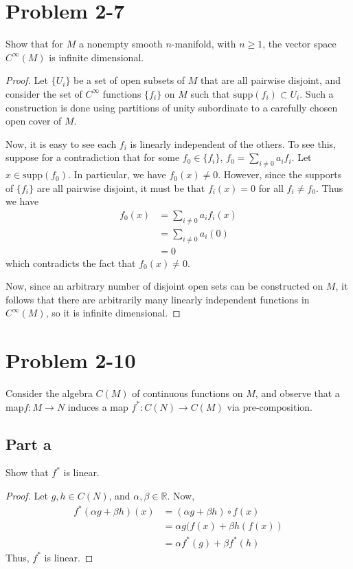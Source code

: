 \documentclass[fontsize=11pt]{scrartcl} %
\numberwithin{equation}{section} %
\numberwithin{figure}{section} %
\numberwithin{table}{section} %
\newcommand{\R}{\mathbb{R}}
\newcommand{\supp}{\textrm{supp}}
\begin{document}
\section*{Problem 2-7}
Show that for $M$ a nonempty smooth $n$-manifold, with $n\geq 1$, the vector space $C^{\infty}(M)$
is infinite dimensional.
\\
\begin{proof}
Let $\{U_i\}$ be a set of open subsets of $M$ that are all pairwise disjoint, and consider
the set of $C^{\infty}$ functions $\{f_i\}$ on $M$ such that $\supp(f_i)\subset U_i$.
Such a construction is done using partitions of unity subordinate to a carefully chosen
open cover of $M$.

Now, it is easy to see each $f_i$ is linearly independent of the others. To see this,
suppose for a contradiction that for some $f_0\in\{f_i\}$, $f_0 = \sum_{i\neq 0} a_if_i$.
Let $x\in\supp(f_0)$. In particular, we have $f_0(x)\neq 0$. However, since the supports
of $\{f_i\}$ are all pairwise disjoint, it must be that $f_i(x)=0$ for all $f_i\neq f_0$.
Thus we have
\[
\begin{aligned}
f_0(x)  &= \sum_{i\neq 0}a_if_i(x)\\
        &= \sum_{i\neq 0}a_i (0)\\
        &= 0
\end{aligned}
\]
which contradicts the fact that $f_0(x)\neq 0$.

Now, since an arbitrary number of disjoint open sets can be constructed on $M$, it follows
that there are arbitrarily many linearly independent functions in $C^{\infty}(M)$,
so it is infinite dimensional.
\end{proof}
\section*{Problem 2-10}
Consider the algebra $C(M)$ of continuous functions on $M$, and observe that a map$f:M\to N$
induces a map $f^*:C(N)\to C(M)$ via pre-composition.
\subsection*{Part a}
Show that $f^*$ is linear.
\\
\begin{proof}
Let $g,h\in C(N)$, and $\alpha,\beta\in\R$. Now,
\[
\begin{aligned}
f^*(\alpha g+\beta h)(x)    &= (\alpha g + \beta h)\circ f(x)\\
                            &= \alpha g(f(x) + \beta h(f(x))\\
                            &= \alpha f^*(g) + \beta f^*(h)
\end{aligned}
\]
Thus, $f^*$ is linear.
\end{proof}
\end{document}
